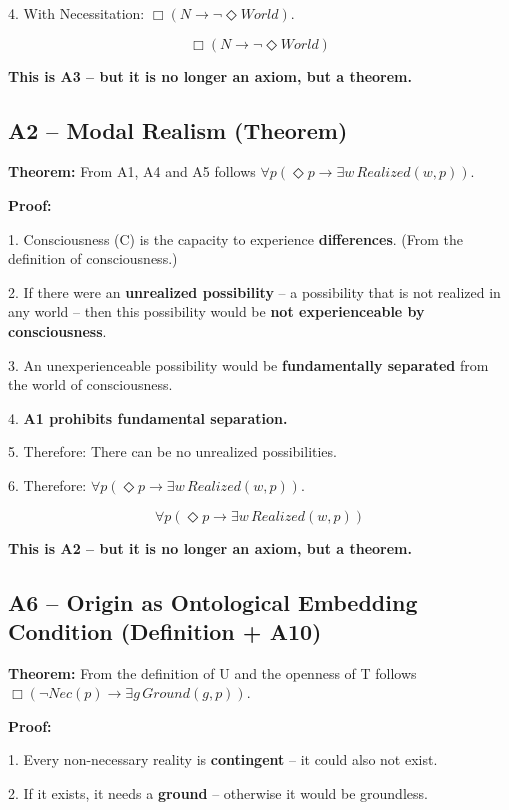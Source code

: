 \documentclass[
]{article}
\begin{document}
4. With Necessitation: \(\Box(N \rightarrow \neg\Diamond World)\).

\[
\boxed{\Box(N \rightarrow \neg\Diamond World)}
\]

\textbf{This is A3 – but it is no longer an axiom, but a theorem.}

\subsection{A2 – Modal Realism (Theorem)}\label{a2-modal-realism-theorem}

\textbf{Theorem:} From A1, A4 and A5 follows \(\forall p(\Diamond p \rightarrow \exists w\, Realized(w,p))\).

\textbf{Proof:}

1. Consciousness (C) is the capacity to experience \textbf{differences}. (From the definition of consciousness.)

2. If there were an \textbf{unrealized possibility} – a possibility that is not realized in any world – then this possibility would be \textbf{not experienceable by consciousness}.

3. An unexperienceable possibility would be \textbf{fundamentally separated} from the world of consciousness.

4. \textbf{A1 prohibits fundamental separation.}

5. Therefore: There can be no unrealized possibilities.

6. Therefore: \(\forall p(\Diamond p \rightarrow \exists w\, Realized(w,p))\).

\[
\boxed{\forall p(\Diamond p \rightarrow \exists w\, Realized(w,p))}
\]

\textbf{This is A2 – but it is no longer an axiom, but a theorem.}

\subsection{A6 – Origin as Ontological Embedding Condition (Definition + A10)}\label{a6-origin-as-ontological-embedding-condition-definition-a10}

\textbf{Theorem:} From the definition of U and the openness of T follows \(\Box(\neg Nec(p) \rightarrow \exists g\, Ground(g,p))\).

\textbf{Proof:}

1. Every non-necessary reality is \textbf{contingent} – it could also not exist.

2. If it exists, it needs a \textbf{ground} – otherwise it would be groundless.
\end{document}
